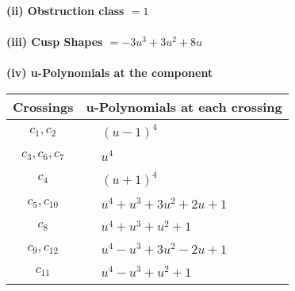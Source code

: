 \documentclass[1p]{elsarticle_modified}
\theoremstyle{definition}
\begin{document}
\flushleft \textbf{(ii) Obstruction class $= 1$}\\~\\
\flushleft \textbf{(iii) Cusp Shapes $= -3 u^3+3 u^2+8 u$}\\~\\
\newpage\renewcommand{\arraystretch}{1}
\flushleft \textbf{(iv) u-Polynomials at the component}\newline \\
\begin{tabular}{m{50pt}|m{274pt}}
Crossings & \hspace{64pt}u-Polynomials at each crossing \\
\hline $$\begin{aligned}c_{1},c_{2}\end{aligned}$$&$\begin{aligned}
&(u-1)^4
\end{aligned}$\\
\hline $$\begin{aligned}c_{3},c_{6},c_{7}\end{aligned}$$&$\begin{aligned}
&u^4
\end{aligned}$\\
\hline $$\begin{aligned}c_{4}\end{aligned}$$&$\begin{aligned}
&(u+1)^4
\end{aligned}$\\
\hline $$\begin{aligned}c_{5},c_{10}\end{aligned}$$&$\begin{aligned}
&u^4+u^3+3 u^2+2 u+1
\end{aligned}$\\
\hline $$\begin{aligned}c_{8}\end{aligned}$$&$\begin{aligned}
&u^4+u^3+u^2+1
\end{aligned}$\\
\hline $$\begin{aligned}c_{9},c_{12}\end{aligned}$$&$\begin{aligned}
&u^4- u^3+3 u^2-2 u+1
\end{aligned}$\\
\hline $$\begin{aligned}c_{11}\end{aligned}$$&$\begin{aligned}
&u^4- u^3+u^2+1
\end{aligned}$\\
\hline
\end{tabular}\\~\\
\end{document}
